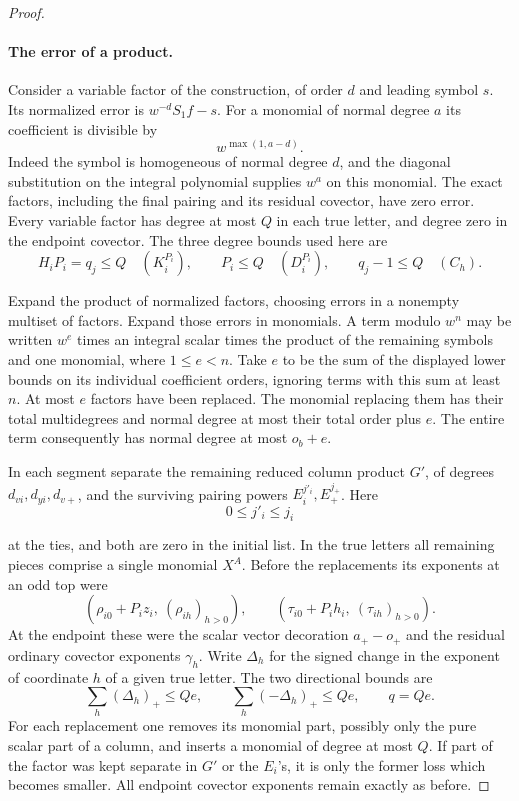 \begin{proof}
\paragraph{The error of a product.}
Consider a variable factor of the construction, of order \(d\)
and leading symbol \(s\). Its normalized error is
\(w^{-d}S_1 f-s\). For a monomial of normal degree \(a\) its
coefficient is divisible by
\[
 w^{\max(1,a-d)}.
\]
Indeed
the symbol is homogeneous of normal degree \(d\), and the
diagonal substitution on the integral polynomial supplies
\(w^a\) on this monomial. The exact factors, including the final
pairing and its residual covector, have zero error. Every variable
factor has degree at most \(Q\) in each true letter, and degree
zero in the endpoint covector. The three degree bounds used here are
\[
 H_i P_i=q_j\le Q\quad(K_i^{P_i}),\qquad P_i\le Q\quad(D_i^{P_i}),\qquad q_j-1\le Q\quad(C_h).
\]


Expand the product of normalized factors, choosing errors in a
nonempty multiset of factors. Expand those errors in monomials.
A term modulo \(w^n\) may be written \(w^e\) times an integral
scalar times the product of the remaining symbols and one monomial,
where \(1\le e<n\). Take \(e\) to be the sum of the displayed
lower bounds on its individual coefficient orders, ignoring terms
with this sum at least \(n\). At most \(e\) factors have been
replaced. The monomial replacing them has their total
multidegrees and normal degree at most their total order plus
\(e\). The entire term consequently has normal degree at most
\(o_b+e\).

In each segment separate the remaining reduced column product
\(G'\), of degrees \(d_{vi},d_{yi},d_{v+}\), and the surviving
pairing powers \(E_i^{j'_i},E_+^{j_+}\). Here
\[
 0\le j'_i\le j_i
\]

at the ties, and both are zero in the initial list. In the
true letters all remaining pieces comprise a single monomial
\(X^A\). Before the replacements its exponents at an odd top were
\[
 (\rho_{i0}+P_i z_i,\ (\rho_{ih})_{h>0}),\qquad
 (\tau_{i0}+P_i h_i,\ (\tau_{ih})_{h>0}).
\]
At the endpoint these were the scalar vector decoration
\(a_+-o_+\) and the residual ordinary covector exponents
\(\gamma_h\). Write \(\Delta_h\) for the signed change in the exponent of coordinate \(h\) of a given true letter. The two directional bounds are
\[
 \sum_h(\Delta_h)_+\le Qe,\qquad \sum_h(-\Delta_h)_+\le Qe,\qquad q=Qe.
\]
For each replacement one removes its monomial
part, possibly only the pure scalar part of a column, and inserts
a monomial of degree at most \(Q\). If part of the factor was kept
separate in \(G'\) or the \(E_i\)'s, it is only the former loss
which becomes smaller. All endpoint covector exponents remain
exactly as before.


\end{proof}

